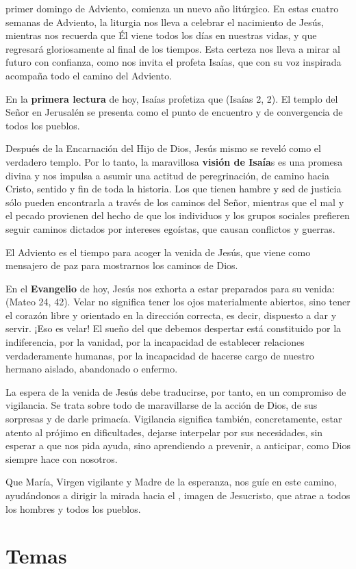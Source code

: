 \begin{body}
	 primer domingo de Adviento, comienza un nuevo año litúrgico. En estas cuatro semanas de Adviento, la liturgia nos lleva a celebrar el nacimiento de Jesús, mientras nos recuerda que Él viene todos los días en nuestras vidas, y que regresará gloriosamente al final de los tiempos. Esta certeza nos lleva a mirar al futuro con confianza, como nos invita el profeta Isaías, que con su voz inspirada acompaña todo el camino del Adviento. 
	
	En la \textbf{primera lectura} de hoy, Isaías profetiza que  (Isaías 2, 2). El templo del Señor en Jerusalén se presenta como el punto de encuentro y de convergencia de todos los pueblos. 
	
	Después de la Encarnación del Hijo de Dios, Jesús mismo se reveló como el verdadero templo. Por lo tanto, la maravillosa \textbf{visión de Isaía}s es una promesa divina y nos impulsa a asumir una actitud de peregrinación, de camino hacia Cristo, sentido y fin de toda la historia. Los que tienen hambre y sed de justicia sólo pueden encontrarla a través de los caminos del Señor, mientras que el mal y el pecado provienen del hecho de que los individuos y los grupos sociales prefieren seguir caminos dictados por intereses egoístas, que causan conflictos y guerras. 
	
	El Adviento es el tiempo para acoger la venida de Jesús, que viene como mensajero de paz para mostrarnos los caminos de Dios. 
	
	En el \textbf{Evangelio} de hoy, Jesús nos exhorta a estar preparados para su venida:  (Mateo 24, 42). Velar no significa tener los ojos materialmente abiertos, sino tener el corazón libre y orientado en la dirección correcta, es decir, dispuesto a dar y servir. ¡Eso es velar! El sueño del que debemos despertar está constituido por la indiferencia, por la vanidad, por la incapacidad de establecer relaciones verdaderamente humanas, por la incapacidad de hacerse cargo de nuestro hermano aislado, abandonado o enfermo. 
	
	La espera de la venida de Jesús debe traducirse, por tanto, en un compromiso de vigilancia. Se trata sobre todo de maravillarse de la acción de Dios, de sus sorpresas y de darle primacía. Vigilancia significa también, concretamente, estar atento al prójimo en dificultades, dejarse interpelar por sus necesidades, sin esperar a que nos pida ayuda, sino aprendiendo a prevenir, a anticipar, como Dios siempre hace con nosotros. 
	
	Que María, Virgen vigilante y Madre de la esperanza, nos guíe en este camino, ayudándonos a dirigir la mirada hacia el , imagen de Jesucristo, que atrae a todos los hombres y todos los pueblos.
\end{body}

\newsection
\section{Temas}

